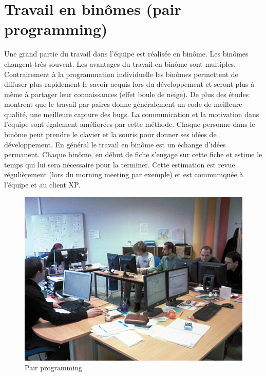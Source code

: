 \section{Travail en binômes (pair programming)}
Une grand partie du travail dans l'équipe est réalisée en binôme. Les binômes changent très souvent. Les avantages du travail en binôme sont multiples. Contrairement à la programmation individuelle les binômes permettent de diffuser plus rapidement le savoir acquis lors du développement et seront plus à même à partager leur connaissances (effet boule de neige). De plus des études montrent que le travail par paires donne généralement un code de meilleure qualité, une meilleure capture des bugs. La communication et la motivation dans l'équipe sont également améliorées par cette méthode. Chaque personne dans le binôme peut prendre le clavier et la souris pour donner ses idées de développement. En général le travail en binôme est un échange d'idées permanent. Chaque binôme, en début de fiche s'engage sur cette fiche et estime le temps qui lui sera nécessaire pour la terminer. Cette estimation est revue régulièrement (lors du morning meeting par exemple) et est communiquée à l'équipe et au client XP.
\begin{figure}[!ht]
\centering
\includegraphics[scale=0.15]{Illustrations/SP_A0188.jpg}
\caption{Pair programming}
\label{fig:Pair programming}
\end{figure}
